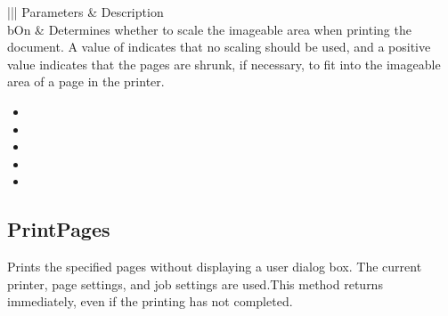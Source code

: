 \documentclass[letterpaper,12pt,english,openany,oneside]{sphinxmanual}
\begin{document}
\begin{savenotes}\sphinxattablestart
\centering
{}\label{\detokenize{IAC_API_OLE_Objects:section-96}}\nobreak
\begin{tabular}[t]{|||}
\hline
\sphinxstyletheadfamily 
Parameters
&\sphinxstyletheadfamily 
Description
\\
\hline
bOn
&
Determines whether to scale the imageable area when printing the document. A value of  indicates that no scaling should be used, and a positive value indicates that the pages are shrunk, if necessary, to fit into the imageable area of a page in the printer.
\\
\hline
\end{tabular}
\par
\sphinxattableend\end{savenotes}
\label{\detokenize{IAC_API_OLE_Objects:related-methods-142}}
\begin{itemize}
\item {} 
 

\item {} 
 

\item {} 
 

\item {} 
 

\item {} 
 

\end{itemize}




\subsection{PrintPages}
\label{\detokenize{IAC_API_OLE_Objects:printpages-1}}\label{\detokenize{IAC_API_OLE_Objects:id25}}
Prints the specified pages without displaying a user dialog box. The current printer, page settings, and job settings are used.This method returns immediately, even if the printing has not completed.
\end{document}
